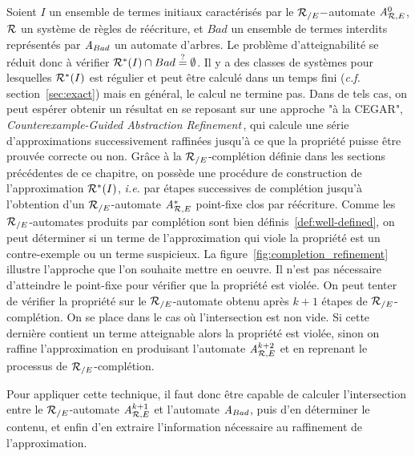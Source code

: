 Soient $I$ un ensemble de termes initiaux caractérisés par le ${\mathcal R_{/E}}-$automate
${\mathit A}_{\mathcal R,E}^0$, $\mathcal R$ un système de règles de réécriture, et $Bad$ un ensemble
de termes interdits représentés par $\mathit A_{Bad}$ un automate d'arbres.
Le problème d'atteignabilité se réduit donc à vérifier 
$\mathcal R^*(I) \cap Bad \stackrel{?}{=}\emptyset$. 
Il y a des classes de systèmes pour lesquelles $\mathcal R^*(I)$ est régulier
et peut être calculé dans un temps fini (\textit{c.f.} section~\ref{sec:exact}) mais
en général, le calcul ne termine pas. Dans de tels cas, on peut espérer 
obtenir un résultat en se reposant sur une approche 
"à la CEGAR", \textit{Counterexample-Guided Abstraction 
  Refinement\,\cite{DBLP:conf/time/Clarke03}}, qui calcule une série d'approximations
successivement raffinées jusqu'à ce que la propriété puisse être prouvée
correcte ou non. 
Grâce à la ${\mathcal R_{/E}}$-complétion définie dans les sections précédentes de ce chapitre,
on possède une procédure de construction de l'approximation $\mathcal R^*(I)$, \textit{i.e.}
par étapes successives de complétion jusqu'à l'obtention d'un ${\mathcal R_{/E}}$-automate ${\mathit A}_{\mathcal R,E}^*$
point-fixe clos par réécriture. Comme les ${\mathcal R_{/E}}$-automates produits par complétion
sont bien définis~\ref{def:well-defined}, on peut déterminer si un terme de l'approximation
qui viole la propriété est un contre-exemple ou un terme suspicieux.
La figure~\ref{fig:completion_refinement} illustre l'approche que l'on souhaite mettre en oeuvre.
Il n'est pas nécessaire d'atteindre le point-fixe pour vérifier que la propriété est violée.
On peut tenter de vérifier la propriété sur le ${\mathcal R_{/E}}$-automate obtenu après $k+1$ étapes
de ${\mathcal R_{/E}}$-complétion. On se place dans le cas où l'intersection est non vide. Si cette dernière 
contient un terme atteignable alors la propriété est violée, sinon on raffine
l'approximation en produisant l'automate ${\mathit A}_{\mathcal R,E}^{k+2}$ et en reprenant le processus de ${\mathcal R_{/E}}$-complétion.



Pour appliquer cette technique, il faut donc être capable de calculer l'intersection entre
le ${\mathcal R_{/E}}$-automate ${\mathit A}_{\mathcal R,E}^{k+1}$ et l'automate $\mathit A_{Bad}$, puis d'en déterminer 
le contenu, et enfin d'en extraire l'information nécessaire au raffinement de l'approximation.

